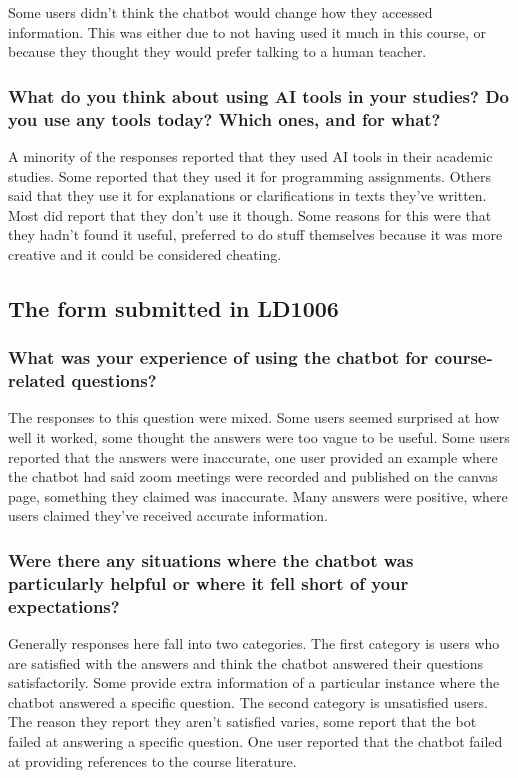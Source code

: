 Some users didn’t think the chatbot would change how they accessed information. This was either due to not having used it much in this course, or because they thought they would prefer talking to a human teacher.


\subsubsection{What do you think about using AI tools in your studies? Do you use any tools today? Which ones, and for what?}


A minority of the responses reported that they used AI tools in their academic studies. Some reported that they used it for programming assignments. Others said that they use it for explanations or clarifications in texts they’ve written. Most did report that they don’t use it though. Some reasons for this were that they hadn’t found it useful, preferred to do stuff themselves because it was more creative and it could be considered cheating.


\subsection{The form submitted in LD1006}


\subsubsection{What was your experience of using the chatbot for course-related questions?}


The responses to this question were mixed. Some users seemed surprised at how well it worked, some thought the answers were too vague to be useful. Some users reported that the answers were inaccurate, one user provided an example where the chatbot had said zoom meetings were recorded and published on the canvas page, something they claimed was inaccurate. Many answers were positive, where users claimed they’ve received accurate information.


\subsubsection{Were there any situations where the chatbot was particularly helpful or where it fell short of your expectations?}


Generally responses here fall into two categories. The first category is users who are satisfied with the answers and think the chatbot answered their questions satisfactorily. Some provide extra information of a particular instance where the chatbot answered a specific question. The second category is unsatisfied users. The reason they report they aren’t satisfied varies, some report that the bot failed at answering a specific question. One user reported that the chatbot failed at providing references to the course literature.


